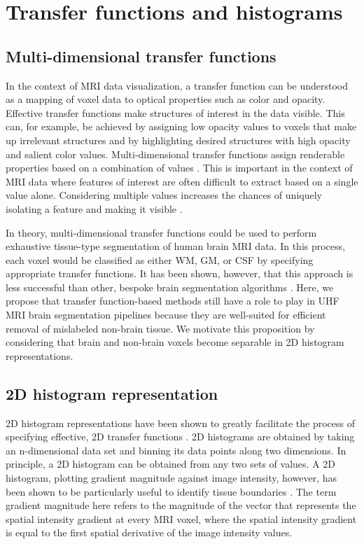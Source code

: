 \section{Transfer functions and histograms}
\label{sec:Theory}

\subsection{Multi-dimensional transfer functions}
In the context of MRI data visualization, a transfer function can be understood as a mapping of voxel data to optical properties such as color and opacity. Effective transfer functions make structures of interest in the data visible. This can, for example, be achieved by assigning low opacity values to voxels that make up irrelevant structures and by highlighting desired structures with high opacity and salient color values. Multi-dimensional transfer functions assign renderable properties based on a combination of values \parencite{Kniss2002, Kindlmann1998, Kniss2005, Kniss2001}. This is important in the context of MRI data where features of interest are often difficult to extract based on a single value alone. Considering multiple values increases the chances of uniquely isolating a feature and making it visible \parencite{Kniss2002}.

In theory, multi-dimensional transfer functions could be used to perform exhaustive tissue-type segmentation of human brain MRI data. In this process, each voxel would be classified as either WM, GM, or CSF by specifying appropriate transfer functions. It has been shown, however, that this approach is less successful than other, bespoke brain segmentation algorithms \parencite{Ljung2016}. Here, we propose that transfer function-based methods still have a role to play in UHF MRI brain segmentation pipelines because they are well-suited for efficient removal of mislabeled non-brain tissue. We motivate this proposition by considering that brain and non-brain voxels become separable in 2D histogram representations.

\subsection{2D histogram representation}
2D histogram representations have been shown to greatly facilitate the process of specifying effective, 2D transfer functions \parencite{Kindlmann1998, Kniss2005}. 2D histograms are obtained by taking an n-dimensional data set and binning its data points along two dimensions. In principle, a 2D histogram can be obtained from any two sets of values. A 2D histogram, plotting gradient magnitude against image intensity, however, has been shown to be particularly useful to identify tissue boundaries \parencite{Kindlmann1998, Kniss2005}. The term gradient magnitude here refers to the magnitude of the vector that represents the spatial intensity gradient at every MRI voxel, where the spatial intensity gradient is equal to the first spatial derivative of the image intensity values.

